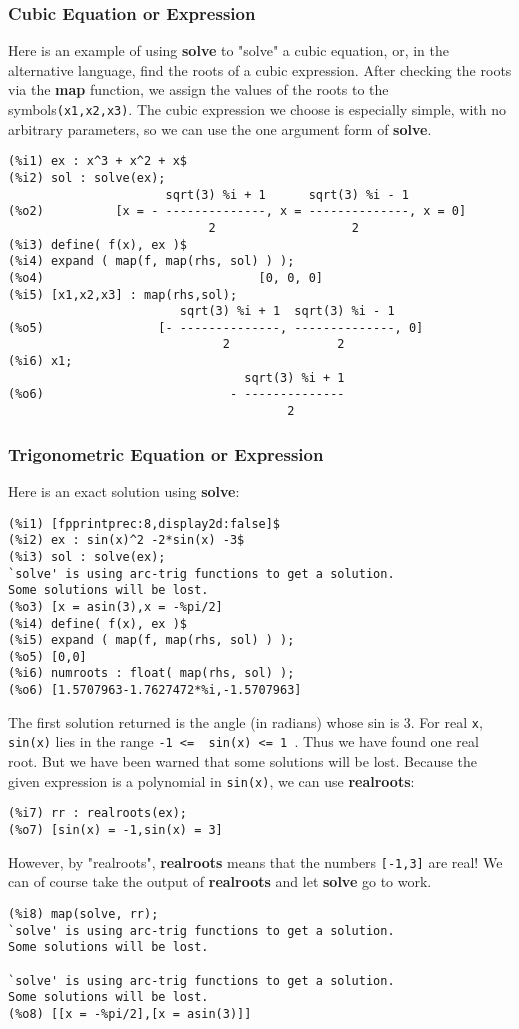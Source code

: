\documentclass[12pt]{article}
\begin{document}
 \subsubsection{Cubic Equation or Expression}
Here is an example of using \textbf{solve} to "solve" a cubic equation, or, in the
  alternative language, find the roots of a cubic expression.
After checking the roots via the \textbf{map} function, we assign the
  values of the roots to the symbols\verb|(x1,x2,x3)|.
The cubic expression we choose is especially simple, with no arbitrary parameters,
  so we can use the one argument form of \textbf{solve}.  
\small
\begin{verbatim}
(%i1) ex : x^3 + x^2 + x$
(%i2) sol : solve(ex);
                      sqrt(3) %i + 1      sqrt(3) %i - 1
(%o2)          [x = - --------------, x = --------------, x = 0]
                            2                   2
(%i3) define( f(x), ex )$
(%i4) expand ( map(f, map(rhs, sol) ) );
(%o4)                              [0, 0, 0]
(%i5) [x1,x2,x3] : map(rhs,sol);
                        sqrt(3) %i + 1  sqrt(3) %i - 1
(%o5)                [- --------------, --------------, 0]
                              2               2
(%i6) x1;
                                 sqrt(3) %i + 1
(%o6)                          - --------------
                                       2
\end{verbatim}
\normalsize

\subsubsection{Trigonometric Equation or Expression}
Here is an exact solution using \textbf{solve}:
\small
\begin{verbatim}
(%i1) [fpprintprec:8,display2d:false]$
(%i2) ex : sin(x)^2 -2*sin(x) -3$
(%i3) sol : solve(ex);
`solve' is using arc-trig functions to get a solution.
Some solutions will be lost.
(%o3) [x = asin(3),x = -%pi/2]
(%i4) define( f(x), ex )$ 
(%i5) expand ( map(f, map(rhs, sol) ) );
(%o5) [0,0]
(%i6) numroots : float( map(rhs, sol) );
(%o6) [1.5707963-1.7627472*%i,-1.5707963]
\end{verbatim}
\normalsize
The first solution returned is the angle (in radians) whose sin is 3. 
For real \verb|x|, \verb|sin(x)| lies in the range \verb|-1 <=  sin(x) <= 1 |.
Thus we have found one real root.
But we have been warned that some solutions will be lost.
Because the given expression is a polynomial in \verb|sin(x)|, we can use \textbf{realroots}:
\small
\begin{verbatim}
(%i7) rr : realroots(ex);
(%o7) [sin(x) = -1,sin(x) = 3]
\end{verbatim}
\normalsize
However, by "realroots", \textbf{realroots} means that the numbers \verb|[-1,3]| are real!
\newpage
We can of course take the output of \textbf{realroots} and let \textbf{solve} go to
  work.
\small
\begin{verbatim}
(%i8) map(solve, rr);
`solve' is using arc-trig functions to get a solution.
Some solutions will be lost.

`solve' is using arc-trig functions to get a solution.
Some solutions will be lost.
(%o8) [[x = -%pi/2],[x = asin(3)]]
\end{verbatim}
\normalsize
\end{document}

